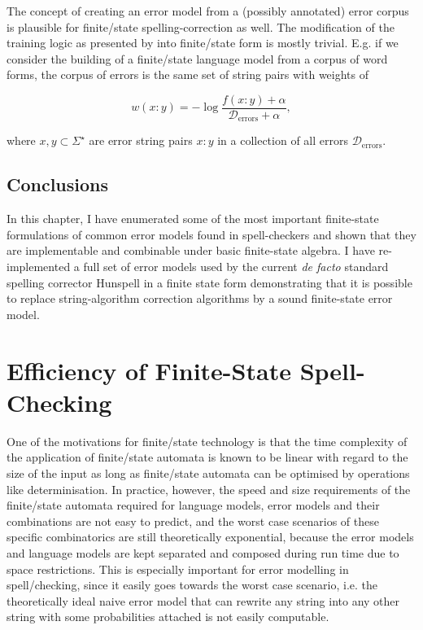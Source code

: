 \documentclass[officiallayout,final]{unihelcompling}
\begin{document}
The concept of creating an error model from a (possibly annotated) error corpus
is plausible for finite\-/state spelling-correction as well. The modification
of the training logic as presented by \citet{church1991probability} into
finite\-/state form is mostly trivial. E.g. if we consider the building of a
finite\-/state language model from a corpus of word forms, the corpus of errors
is the same set of string pairs with weights of 

\begin{equation}
    w(x:y) = -\log\frac{f(x:y) + \alpha}{\mathcal{D}_\mathrm{errors} + \alpha},
\end{equation}

\noindent where $x, y \subset \Sigma^\star$ are error string pairs $x:y$ in a collection
of all errors $\mathcal{D}_\mathrm{errors}$.

\section{Conclusions}

In this chapter, I have enumerated some of the most important finite-state
formulations of common error models found in spell-checkers and shown that they
are implementable and combinable under basic finite-state algebra. I have
re-implemented a full set of error models used by the current \emph{de facto}
standard spelling corrector Hunspell in a finite state form demonstrating that
it is possible to replace string-algorithm correction algorithms by a sound
finite-state error model.

\chapter{Efficiency of Finite-State Spell-Checking}
\label{chap:efficiency}

One of the motivations for finite\-/state technology is that the time
complexity of the application of finite\-/state automata is known to be linear
with regard to the size of the input as long as finite\-/state automata can be
optimised by operations like determinisation. In practice, however, the speed
and size requirements of the finite\-/state automata required for language
models, error models and their combinations are not easy to predict, and the
worst case scenarios of these specific combinatorics are still theoretically
exponential, because the error models and language models are kept separated
and composed during run time due to space restrictions. This is especially
important for error modelling in spell\-/checking, since it easily goes towards
the worst case scenario, i.e. the theoretically ideal naive error model that
can rewrite any string into any other string with some probabilities attached
is not easily computable.
\end{document}
